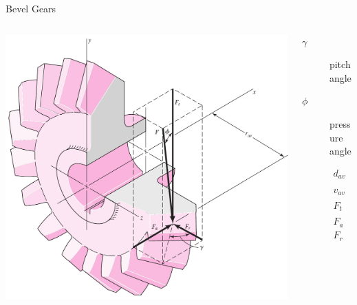 \documentclass[10pt, svgnames]{beamer}
\begin{document}
\begin{frame}[label={sec:org0511277}]{Bevel Gears}
\begin{columns}
\begin{column}{0.5\columnwidth}
\begin{center}
\includegraphics[width=1.2\textwidth]{pictures/bevel-gear-forces.png}
\end{center}
\end{column}

\begin{column}{0.5\columnwidth}
\begin{description}
\item[{\(\gamma\)}] pitch angle

\item[{\(\phi\)}] pressure angle

\begin{align*}
  d_{av} &= d - b \sin \gamma \\
  v_{av} &= \omega \frac{d_{av}}{2} \\
  F_{t} &= \frac{\text{Power}}{v_{av}} \\
  F_{a} &= F_{t} \tan \phi \sin \gamma \\
  F_{r} &= F_{t} \tan \phi \cos \gamma
\end{align*}
\end{description}
\end{column}
\end{columns}
\end{frame}
\end{document}
